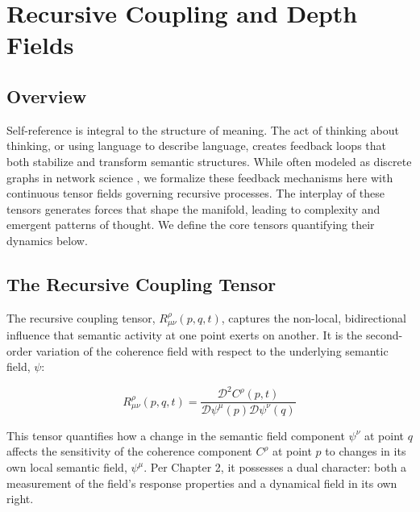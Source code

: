 \chapter{Recursive Coupling and Depth Fields}
\label{4:recursive_coupling_and_depth_fields}


\section{Overview}
\label{4.1:overview}

Self-reference is integral to the structure of meaning. The act of thinking about thinking, or using language to describe language, creates feedback loops that both stabilize and transform semantic structures. While often modeled as discrete graphs in network science \autocite{Barabasi2016}, we formalize these feedback mechanisms here with continuous tensor fields governing recursive processes. The interplay of these tensors generates forces that shape the manifold, leading to complexity and emergent patterns of thought. We define the core tensors quantifying their dynamics below.


\section{The Recursive Coupling Tensor}
\label{4.2:the_recursive_coupling_tensor}

The recursive coupling tensor, \(R^\rho_{\mu\nu}(p, q, t)\), captures the non-local, bidirectional influence that semantic activity at one point exerts on another. It is the second-order variation of the coherence field with respect to the underlying semantic field, \(\psi\):

\begin{equation}
R^\rho_{\mu\nu}(p, q, t) = \frac{\mathcal{D}^2 C^\rho(p,t)}{\mathcal{D} \psi^\mu(p) \mathcal{D} \psi^\nu(q)}
\end{equation}

This tensor quantifies how a change in the semantic field component \(\psi^\nu\) at point \(q\) affects the sensitivity of the coherence component \(C^\rho\) at point \(p\) to changes in its own local semantic field, \(\psi^\mu\). Per Chapter 2, it possesses a dual character: both a measurement of the field's response properties and a dynamical field in its own right.

